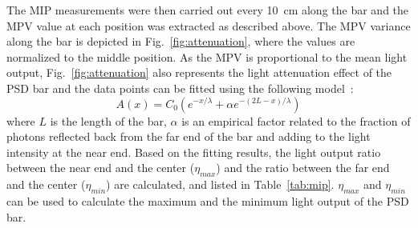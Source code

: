 \documentclass[preprint, times]{elsarticle}
\begin{document}
The MIP measurements were then carried out every \SI{10}{\centi\meter} along the bar and the MPV value at each position was extracted as described above.
The MPV variance along the bar is depicted in Fig.~\ref{fig:attenuation}, where the values are normalized to the middle position.
As the MPV is proportional to the mean light output, Fig.~\ref{fig:attenuation} also represents the light attenuation effect of the PSD bar and the data points can be fitted using the following model~\cite{taiuti_measurement_1996}:
\begin{equation}
\label{eq:attenuation}
A(x)=C_0(e^{-x/\lambda} + \alpha e^{-(2L-x)/\lambda})
\end{equation}
where $L$ is the length of the bar, $\alpha$ is an empirical factor related to the fraction of photons reflected back from the far end of the bar and adding to the light intensity at the near end.
Based on the fitting results, the light output ratio between the near end and the center ($\eta_{max}$) and the ratio between the far end and the center ($\eta_{min}$) are calculated,  and listed in Table~\ref{tab:mip}.
$\eta_{max}$ and $\eta_{min}$ can be used to calculate the maximum and the minimum light output of the PSD bar.
\end{document}
